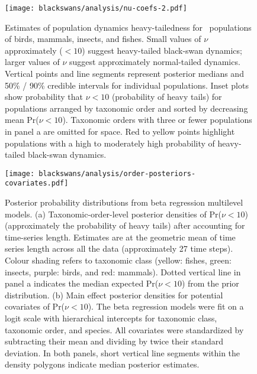 \clearpage

\begin{figure}[htbp]
\begin{center}
\texttt{[image: blackswans/analysis/nu-coefs-2.pdf]}

\caption[Estimates of population dynamics heavy-tailedness for \nuCoefPopN\
  populations of birds, mammals, insects, and fishes.]{Estimates of population dynamics heavy-tailedness for \nuCoefPopN\
  populations of birds, mammals, insects, and fishes. Small values of $\nu$
  approximately ($< 10$) suggest heavy-tailed black-swan dynamics; larger values of
  $\nu$ suggest approximately normal-tailed dynamics. Vertical points and line
  segments represent posterior medians and 50\% / 90\% credible intervals for
  individual populations. Inset plots show probability that $\nu < 10$
  (probability of heavy tails) for populations arranged by taxonomic order and
  sorted by decreasing mean Pr($\nu < 10$). Taxonomic orders with three or
  fewer populations in panel a are omitted for space. Red to yellow points
  highlight populations with a high to moderately high probability of
  heavy-tailed black-swan dynamics.}

\label{fig:nu-coefs}
\end{center}
\end{figure}
\clearpage

\begin{figure}[htbp]
\begin{center}
\texttt{[image: blackswans/analysis/order-posteriors-covariates.pdf]}

\caption[Posterior probability distributions from beta regression multilevel
  models.]{Posterior probability distributions from beta regression multilevel
  models. (a) Taxonomic-order-level posterior densities of Pr($\nu < 10$)
  (approximately the probability of heavy tails) after accounting for
  time-series length. Estimates are at the geometric mean of time series
  length across all the data (approximately 27 time steps). Colour shading
  refers to taxonomic class (yellow: fishes, green: insects, purple: birds,
  and red: mammals). Dotted vertical line in panel a indicates the median
  expected Pr($\nu < 10$) from the prior distribution. (b) Main effect
  posterior densities for potential covariates of Pr($\nu < 10$). The beta
  regression models were fit on a logit scale with hierarchical intercepts for
  taxonomic class, taxonomic order, and species. All covariates were
  standardized by subtracting their mean and dividing by twice their standard
  deviation. In both panels, short vertical line segments within the density
  polygons indicate median posterior estimates.}

\label{fig:posteriors}
\end{center}
\end{figure}

